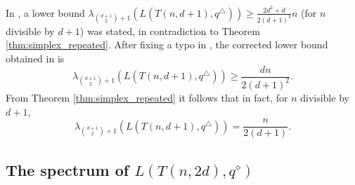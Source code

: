 \documentclass[a4paper,11pt]{article}
\theoremstyle{plain}
\theoremstyle{definition}
\newenvironment{remark}[1][Remark.]{\begin{trivlist}
		\item[\hskip \labelsep {\bfseries #1}]}{\end{trivlist}}
\begin{document}
\begin{remark}
In \cite{jordan2020rigidity}, a lower bound $\lambda_{\binom{d+1}{2}+1}(L(T(n,d+1),q^{\triangle}))\geq \frac{2d^2+d}{2(d+1)^3}n$ (for $n$ divisible by $d+1$) was stated, in contradiction to Theorem \ref{thm:simplex_repeated}. After fixing a typo in \cite[Lemma 5.4]{jordan2020rigidity}, the corrected lower bound obtained in \cite{jordan2020rigidity} is
\[
\lambda_{\binom{d+1}{2}+1}(L(T(n,d+1),q^{\triangle}))\geq \frac{d n}{2(d+1)^2}.
\]
From Theorem \ref{thm:simplex_repeated} it follows that in fact, for $n$ divisible by $d+1$, 
\[
\lambda_{\binom{d+1}{2}+1}(L(T(n,d+1),q^{\triangle}))= \frac{n}{2(d+1)}.
\]
\end{remark}






\subsection{The spectrum of $L(T(n,2d),q^{\diamond})$}
\end{document}
